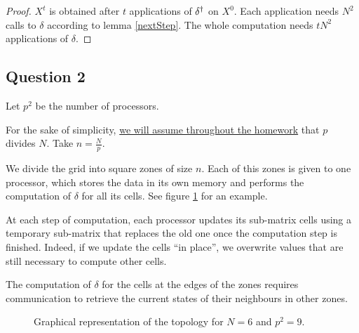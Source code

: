 \begin{proof}
 $X^t$ is obtained after $t$ applications of $\delta^{\dag}$ on $X^0$. Each application needs $N^2$ calls to $\delta$ according to lemma \ref{nextStep}. The whole computation needs $tN^2$ applications of $\delta$.
\end{proof}


\subsection*{Question 2}

Let $p^2$ be the number of processors.

For the sake of simplicity, \underline{we will assume throughout the homework} that $p$ divides $N$. Take $n = \frac{N}{p}$.

We divide the grid into square zones of size $n$. Each of this zones is given to one processor, which stores the data in its own memory and performs the computation of $\delta$ for all its cells. See figure \ref{q2:draw} for an example.

At each step of computation, each processor updates its sub-matrix cells using a temporary sub-matrix that replaces the old one once the computation step is finished. Indeed,  if we update the cells ``in place'', we overwrite values that are still necessary to compute other cells.

The computation of $\delta$ for the cells at the edges of the zones requires communication to retrieve the current states of their neighbours in other zones.

\begin{figure}
\caption{Graphical representation of the topology for $N=6$ and $p^2=9$.}
\label{q2:draw}
\begin{center}
\end{center}
\end{figure}

